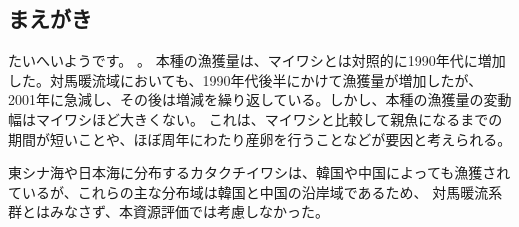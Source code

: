 \subsection{まえがき}
たいへいようです。
\cite{2006b}。
本種の漁獲量は、マイワシとは対照的に1990年代に増加した。対馬暖流域においても、1990年代後半にかけて漁獲量が増加したが、
2001年に急減し、その後は増減を繰り返している。しかし、本種の漁獲量の変動幅はマイワシほど大きくない。
これは、マイワシと比較して親魚になるまでの期間が短いことや、ほぼ周年にわたり産卵を行うことなどが要因と考えられる。

東シナ海や日本海に分布するカタクチイワシは、韓国や中国によっても漁獲されているが、これらの主な分布域は韓国と中国の沿岸域であるため、
対馬暖流系群とはみなさず、本資源評価では考慮しなかった。